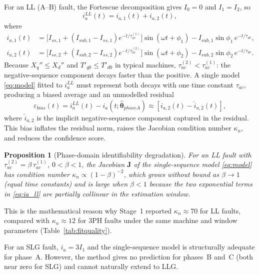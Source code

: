 \documentclass[10pt,journal,twoside]{IEEEtran}
\newtheorem{proposition}{Proposition}
\begin{document}
For an LL (A--B) fault, the Fortescue decomposition gives
$I_0 = 0$ and $I_1 = I_2$, so
\begin{equation}
i_a^{LL}(t) = i_{a,1}(t) + i_{a,2}(t),
\label{eq:ia_ll}
\end{equation}
where
\begin{align}
i_{a,1}(t) &= \bigl[I_{ss,1} + (I_{sub,1} - I_{ss,1})e^{-t/\tau_{ac}^{(1)}}\bigr]
               \sin(\omega t + \phi_1)
               - I_{sub,1}\sin\phi_1\,e^{-t/\tau_{dc}},
               \label{eq:ia1}\\
i_{a,2}(t) &= \bigl[I_{ss,2} + (I_{sub,2} - I_{ss,2})e^{-t/\tau_{ac}^{(2)}}\bigr]
               \sin(\omega t + \phi_2)
               - I_{sub,2}\sin\phi_2\,e^{-t/\tau_{dc}}.
               \label{eq:ia2}
\end{align}
Because $X_q'' \leq X_d''$ and $T'_{q0} \leq T'_{d0}$ in typical machines,
$\tau_{ac}^{(2)} < \tau_{ac}^{(1)}$: the negative-sequence component decays
faster than the positive.  A single model \eqref{eq:model} fitted to
$i_a^{LL}$ must represent both decays with one time constant $\tau_{ac}$,
producing a biased average and an unmodelled residual
\begin{equation}
\varepsilon_{bias}(t) = i_a^{LL}(t) - i_a(t;\hat{\bm{\theta}}_{phaseA})
  \approx [i_{a,2}(t) - \hat{i}_{a,2}(t)],
\end{equation}
where $\hat{i}_{a,2}$ is the implicit negative-sequence component captured
in the residual.  This bias inflates the residual norm, raises the Jacobian
condition number $\kappa_n$, and reduces the confidence score.

\begin{proposition}[Phase-domain identifiability degradation]
\label{prop:kn}
For an LL fault with $\tau_{ac}^{(2)} = \beta\,\tau_{ac}^{(1)}$,
$0 < \beta < 1$, the Jacobian $\mathbf{J}$ of the single-sequence model
\eqref{eq:model} has condition number
$\kappa_n \propto (1 - \beta)^{-2}$,
which grows without bound as $\beta \to 1$ (equal time constants) and
is large when $\beta < 1$ because the two exponential terms in
\eqref{eq:ia_ll} are partially collinear in the estimation window.
\end{proposition}

\noindent
This is the mathematical reason why Stage~1 reported $\kappa_n \approx 70$
for LL faults, compared with $\kappa_n \approx 12$ for 3PH faults under the
same machine and window parameters (Table~\ref{tab:fitquality}).

For an SLG fault, $i_a = 3I_1$ and the single-sequence model is
structurally adequate for phase~A.  However, the method gives no
prediction for phases~B and~C (both near zero for SLG) and cannot
naturally extend to LLG.
\end{document}
